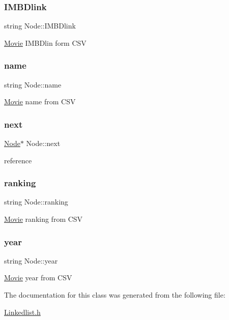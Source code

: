 \subsubsection{\texorpdfstring{I\+M\+B\+Dlink}{IMBDlink}}
{\footnotesize\ttfamily string Node\+::\+I\+M\+B\+Dlink}

\hyperlink{classMovie}{Movie} I\+M\+B\+Dlin form C\+SV \mbox{\label{classNode_a4cd656d544174479df27f0759e5a3997}} 
\subsubsection{\texorpdfstring{name}{name}}
{\footnotesize\ttfamily string Node\+::name}

\hyperlink{classMovie}{Movie} name from C\+SV \mbox{\label{classNode_a2559a716f69ccaa76d648d9f1b83065e}} 
\subsubsection{\texorpdfstring{next}{next}}
{\footnotesize\ttfamily \hyperlink{classNode}{Node}$\ast$ Node\+::next}

reference \mbox{\label{classNode_a0da19ae4ea31aa6149cf3c3186cd73df}} 
\subsubsection{\texorpdfstring{ranking}{ranking}}
{\footnotesize\ttfamily string Node\+::ranking}

\hyperlink{classMovie}{Movie} ranking from C\+SV \mbox{\label{classNode_a4f6ff565b56749f038ee05d16df44ad5}} 
\subsubsection{\texorpdfstring{year}{year}}
{\footnotesize\ttfamily string Node\+::year}

\hyperlink{classMovie}{Movie} year from C\+SV 

The documentation for this class was generated from the following file\+:\begin{DoxyCompactItemize}
\item 
\hyperlink{Linkedlist_8h}{Linkedlist.\+h}\end{DoxyCompactItemize}
